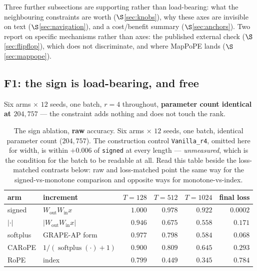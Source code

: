\documentclass[11pt]{article}
\DeclareMathOperator{\softplus}{softplus}
\begin{document}
\noindent Three further subsections are supporting rather than load-bearing: what
the neighbouring constraints are worth ($\S$\ref{sec:knobs}), why these axes are
invisible on text ($\S$\ref{sec:navigation}), and a cost/benefit summary
($\S$\ref{sec:anchors}). Two report on specific mechanisms rather than axes: the
published external check ($\S$\ref{sec:flipflop}), which does not discriminate, and
where MapPoPE lands ($\S$\ref{sec:mappope}).

\subsection{F1: the sign is load-bearing, and free}
\label{sec:sign}

Six arms $\times$ $12$ seeds, one batch, $r=4$ throughout, \textbf{parameter count
identical at $204{,}757$} --- the constraint adds nothing and does not touch the rank.

\begin{table}[htbp]\centering\small
\caption{The sign ablation, \textbf{raw} accuracy. Six arms $\times$ $12$ seeds, one batch, identical parameter count ($204{,}757$). The construction control \texttt{Vanilla\_r4}, omitted here for width, is within $+0.006$ of \texttt{signed} at every length --- \emph{unmeasured}, which is the condition for the batch to be readable at all. Read this table beside the loss-matched contrasts below: raw and loss-matched point the same way for the signed-vs-monotone comparison and opposite ways for monotone-vs-index.}
\label{tab:sign}
\begin{tabular}{llrrrr}
\toprule
arm & increment & $T{=}128$ & $T{=}512$ & $T{=}1024$ & final loss \\
\midrule
signed  & $W_{\mathrm{out}}W_{\mathrm{in}}x$ & $1.000$ & $0.978$ & $0.922$ & $0.0002$ \\
\midrule
$|\cdot|$ & $|W_{\mathrm{out}}W_{\mathrm{in}}x|$ & $0.946$ & $0.675$ & $0.558$ & $0.171$ \\
softplus  & GRAPE-AP form                       & $0.977$ & $0.798$ & $0.584$ & $0.068$ \\
CARoPE    & $1/(\softplus(\cdot)+1)$            & $0.900$ & $0.809$ & $0.645$ & $0.293$ \\
\midrule
RoPE      & index                               & $0.799$ & $0.449$ & $0.345$ & $0.784$ \\
\bottomrule
\end{tabular}
\end{table}
\end{document}
